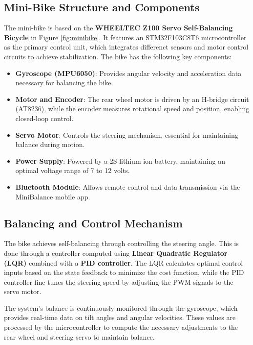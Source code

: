 	
	\subsection{Mini-Bike Structure and Components}
	The mini-bike is based on the \textbf{WHEELTEC Z100 Servo Self-Balancing Bicycle} in Figure \ref{fig:minibike}. It features an STM32F103C8T6 microcontroller as the primary control unit, which integrates differenct sensors and motor control circuits to achieve stabilization. The bike has the following key components:
	\begin{itemize}
		\item \textbf{Gyroscope (MPU6050)}: Provides angular velocity and acceleration data necessary for balancing the bike.
		\item \textbf{Motor and Encoder}: The rear wheel motor is driven by an H-bridge circuit (AT8236), while the encoder measures rotational speed and position, enabling closed-loop control.
		\item \textbf{Servo Motor}: Controls the steering mechanism, essential for maintaining balance during motion.
		\item \textbf{Power Supply}: Powered by a 2S lithium-ion battery, maintaining an optimal voltage range of 7 to 12 volts.
		\item \textbf{Bluetooth Module}: Allows remote control and data transmission via the MiniBalance mobile app.
	\end{itemize}
	
	\subsection{Balancing and Control Mechanism}
	The bike achieves self-balancing through controlling the steering angle. This is done through a controller computed using \textbf{Linear Quadratic Regulator (LQR)} combined with a \textbf{PID controller}. The LQR calculates optimal control inputs based on the state feedback to minimize the cost function, while the PID controller fine-tunes the steering speed by adjusting the PWM signals to the servo motor.
	
	The system's balance is continuously monitored through the gyroscope, which provides real-time data on tilt angles and angular velocities. These values are processed by the microcontroller to compute the necessary adjustments to the rear wheel and steering servo to maintain balance.
	

